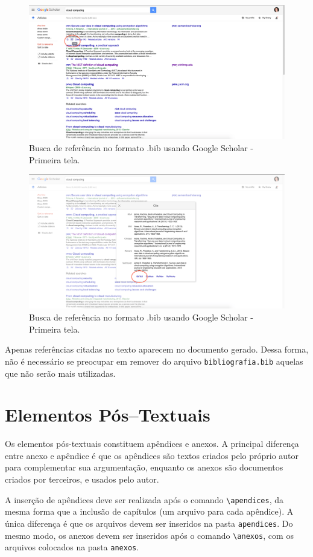 \begin{figure}[H]
  \centering
  \includegraphics[width=1.0\textwidth]{./fig/scholar01}
  \caption{Busca de referência no formato .bib usando Google Scholar - Primeira tela.}
  \label{fig:scholar01}
\end{figure}

\begin{figure}[H]
  \centering
  \includegraphics[width=1.0\textwidth]{./fig/scholar02}
  \caption{Busca de referência no formato .bib usando Google Scholar - Primeira tela.}
  \label{fig:scholar02}
\end{figure}

Apenas referências citadas no texto aparecem no documento gerado. Dessa forma, não é necessário se preocupar em remover do arquivo \verb|bibliografia.bib| aquelas que não serão mais utilizadas.

\section{Elementos Pós--Textuais}
\label{sec:pos}

Os elementos pós-textuais constituem apêndices e anexos. A principal diferença entre anexo e apêndice é que os apêndices são textos criados pelo próprio autor para complementar sua argumentação, enquanto os anexos são documentos criados por terceiros, e usados pelo autor. 

A inserção de apêndices deve ser realizada após o comando \verb|\apendices|, da mesma forma que a inclusão de capítulos (um arquivo para cada apêndice). A única diferença é que os arquivos devem ser inseridos na pasta \verb|apendices|. Do mesmo modo, os anexos devem ser inseridos após o comando \verb|\anexos|, com os arquivos colocados na pasta \verb|anexos|.